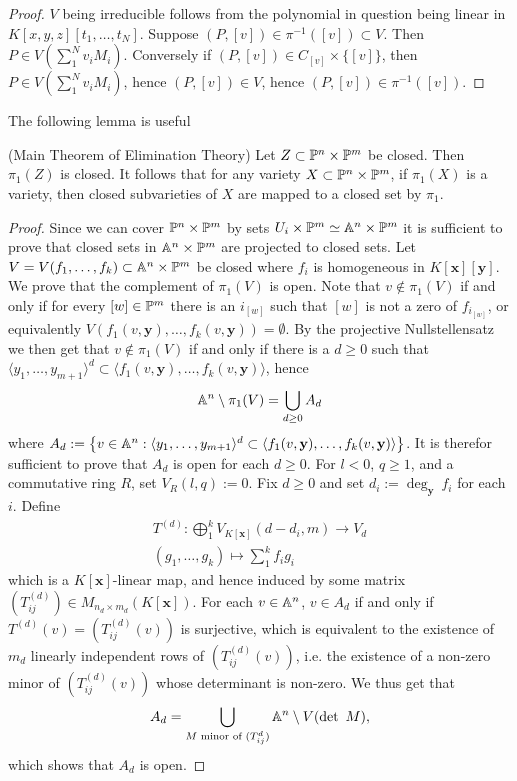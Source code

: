         \begin{proof}
            $V$ being irreducible follows from the polynomial in question being linear in\\ 
            $K[x,y,z][t_1,\dots,t_N]$. Suppose $(P,[v])\in \pi^{-1}([v])\subset V$. Then $P\in V\left(\sum_1^N v_iM_i\right)$. Conversely if $(P,[v])\in C_{[v]}\times \{[v]\}$, then $P\in V\left( \sum_1^N v_iM_i\right)$, hence $(P,[v])\in V$, hence $(P,[v])\in \pi^{-1}([v])$.
        \end{proof}
        The following lemma is useful
        \begin{lemma}(Main Theorem of Elimination Theory)
            Let $Z\subset \mathbb{P}^n\times \mathbb{P}^m$ be closed. Then $\pi_1(Z)$ is closed. It follows that for any variety $X\subset \mathbb{P}^n\times \mathbb{P}^m$, if $\pi_1(X)$ is a variety, then closed subvarieties of $X$ are mapped to a closed set by $\pi_1$.
        \end{lemma}
        \begin{proof}
            Since we can cover $\mathbb{P}^n\times \mathbb{P}^m$ by sets $U_i\times \mathbb{P}^m\simeq \mathbb{A}^n\times \mathbb{P}^m$ it is sufficient to prove that closed sets in $\mathbb{A}^n\times \mathbb{P}^m$ are projected to closed sets. Let $V=V(f_1,\dots,f_k)\subset \mathbb{A}^n\times \mathbb{P}^m$ be closed where $f_i$ is homogeneous in $K[\mathbf{x}][\mathbf{y}]$. We prove that the complement of $\pi_1(V)$ is open. Note that $v\notin \pi_1(V)$ if and only if for every $[w]\in \mathbb{P}^m$ there is an $i_{[w]}$ such that $[w]$ is not a zero of $f_{i_{[w]}}$, or equivalently $V(f_1(v,\mathbf{y}),\dots,f_k(v,\mathbf{y}))=\emptyset$. By the projective Nullstellensatz we then get that $v\notin \pi_1(V)$ if and only if there is a $d\geq 0$ such that $\langle y_1,\dots,y_{m+1}\rangle^d \subset \langle f_1(v,\mathbf{y}),\dots,f_k(v,\mathbf{y})\rangle$, hence 
            $$\mathbb{A}^n\setminus \pi_1(V) = \bigcup_{d\geq 0} A_d$$
            where $A_d:=\left\{ v\in \mathbb{A}^n : \langle y_1,\dots,y_{m+1}\rangle^d \subset \langle f_1(v,\mathbf{y}),\dots,f_k(v,\mathbf{y})\rangle \right\}$. It is therefor sufficient to prove that $A_d$ is open for each $d\geq 0$. For $l<0$, $q\geq 1$, and a commutative ring $R$, set $V_R(l,q):=0$. Fix $d\geq 0$ and set $d_i:= \deg_{\mathbf{y}}\ f_i$ for each $i$. Define 
            \begin{gather*}
                T^{(d)} : \bigoplus_1^k V_{K[\mathbf{x}]}(d-d_i,m) \rightarrow V_d\\
                (g_1,\dots,g_k)\mapsto \sum_1^k f_ig_i
            \end{gather*}
            which is a $K[\mathbf{x}]$-linear map, and hence induced by some matrix $(T_{ij}^{(d)})\in M_{n_d\times m_d}(K[\mathbf{x}])$. For each $v\in \mathbb{A}^n$, $v\in A_d$ if and only if $T^{(d)}(v)=(T_{ij}^{(d)}(v))$ is surjective, which is equivalent to the existence of $m_d$ linearly independent rows of $(T_{ij}^{(d)}(v))$, i.e. the existence of a non-zero minor of $(T_{ij}^{(d)}(v))$ whose determinant is non-zero. We thus get that 
            $$A_d = \bigcup_{M \text{ minor of } (T_{ij}^{d})} \mathbb{A}^n\setminus V(\det\ M),$$
            which shows that $A_d$ is open.
        \end{proof}
